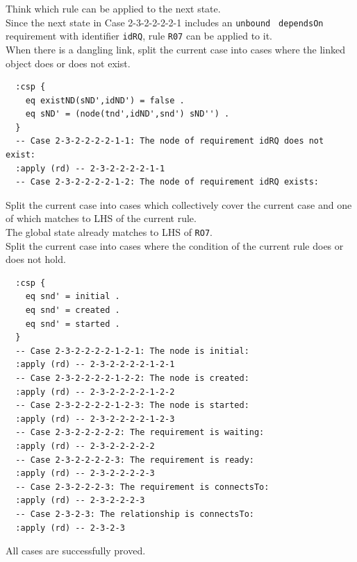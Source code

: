 \documentclass[12pt]{report}
\begin{document}
 Think which rule can be applied to the next
state. \\
Since the next state in Case 2-3-2-2-2-2-1 includes an {\tt unbound} {\tt
  dependsOn} requirement with identifier {\tt idRQ}, rule {\tt R07} can
be applied to it.\\

 When there is a dangling link, split the
current case into cases where the linked object does or does not
exist.
\small
\begin{verbatim}
  :csp {
    eq existND(sND',idND') = false .
    eq sND' = (node(tnd',idND',snd') sND'') .
  }
  -- Case 2-3-2-2-2-2-1-1: The node of requirement idRQ does not exist:
  :apply (rd) -- 2-3-2-2-2-2-1-1
  -- Case 2-3-2-2-2-2-1-2: The node of requirement idRQ exists:
\end{verbatim}
\normalsize

 Split the current case into cases which
collectively cover the current case and one of which matches to LHS of
the current rule. \\
The global state already matches to LHS of {\tt RO7}.\\

 Split the current case into cases where the
condition of the current rule does or does not hold.
\small
\begin{verbatim}
  :csp {
    eq snd' = initial .
    eq snd' = created .
    eq snd' = started .
  }
  -- Case 2-3-2-2-2-2-1-2-1: The node is initial:
  :apply (rd) -- 2-3-2-2-2-2-1-2-1
  -- Case 2-3-2-2-2-2-1-2-2: The node is created:
  :apply (rd) -- 2-3-2-2-2-2-1-2-2
  -- Case 2-3-2-2-2-2-1-2-3: The node is started:
  :apply (rd) -- 2-3-2-2-2-2-1-2-3
  -- Case 2-3-2-2-2-2-2: The requirement is waiting:
  :apply (rd) -- 2-3-2-2-2-2-2
  -- Case 2-3-2-2-2-2-3: The requirement is ready:
  :apply (rd) -- 2-3-2-2-2-2-3
  -- Case 2-3-2-2-2-3: The requirement is connectsTo:
  :apply (rd) -- 2-3-2-2-2-3
  -- Case 2-3-2-3: The relationship is connectsTo:
  :apply (rd) -- 2-3-2-3
\end{verbatim}
\normalsize

All cases are successfully proved.
\end{document}
